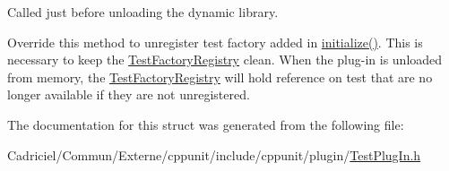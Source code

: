 Called just before unloading the dynamic library. 

Override this method to unregister test factory added in \hyperlink{struct_cpp_unit_test_plug_in_aec670330e7fced26c2a66b1dcd56edc0}{initialize()}. This is necessary to keep the \hyperlink{class_test_factory_registry}{Test\+Factory\+Registry} \textquotesingle{}clean\textquotesingle{}. When the plug-\/in is unloaded from memory, the \hyperlink{class_test_factory_registry}{Test\+Factory\+Registry} will hold reference on test that are no longer available if they are not unregistered. 

The documentation for this struct was generated from the following file\+:\begin{DoxyCompactItemize}
\item 
Cadriciel/\+Commun/\+Externe/cppunit/include/cppunit/plugin/\hyperlink{_test_plug_in_8h}{Test\+Plug\+In.\+h}\end{DoxyCompactItemize}

